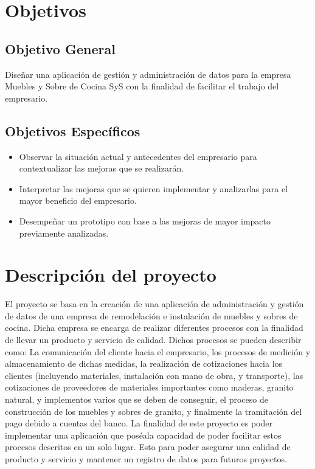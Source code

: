 \documentclass[conference]{IEEEtran}
\begin{document}
\section{Objetivos}

\subsection{Objetivo General}
Diseñar una aplicación de gestión y administración de datos para la empresa Muebles y Sobre de Cocina SyS con la finalidad de facilitar el trabajo del empresario.

\subsection{Objetivos Específicos}
\begin{itemize}
\item Observar la situación actual y antecedentes del empresario para contextualizar las mejoras que se realizarán.
\item Interpretar las mejoras que se quieren implementar y analizarlas para el mayor beneficio del empresario.
\item Desempeñar un prototipo con base a las mejoras de mayor impacto previamente analizadas.
\end{itemize}


\section{Descripción del proyecto}

El proyecto se basa en la creación de una aplicación de administración y gestión de datos de una empresa de remodelación e instalación de muebles y sobres de cocina. Dicha empresa se encarga de realizar diferentes procesos con la finalidad de llevar un producto y servicio de calidad. Dichos procesos se pueden describir como: La comunicación del cliente hacia el empresario, los procesos de medición y almacenamiento de dichas medidas, la realización de cotizaciones hacia los clientes (incluyendo materiales, instalación con mano de obra, y transporte), las cotizaciones de proveedores de materiales importantes como maderas, granito natural, y implementos varios que se deben de conseguir, el proceso de construcción de los muebles y sobres de granito, y finalmente la tramitación del pago debido a cuentas del banco. La finalidad de este proyecto es poder implementar una aplicación que poséala capacidad de poder facilitar estos procesos descritos en un solo lugar. Esto para poder asegurar una calidad de producto y servicio y mantener un registro de datos para futuros proyectos.
\end{document}
